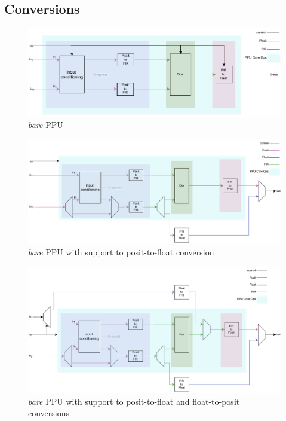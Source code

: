 \subsection{Conversions}







\begin{figure}[H]
        \centering
        \includegraphics[width=1\textwidth]{figures/top_no_conversions.pdf}
        \caption{\textit{bare} PPU}
\end{figure}
\begin{figure}
        \includegraphics[width=1\textwidth]{figures/top_P2F.pdf}
        \caption{\textit{bare} PPU with support to posit-to-float conversion}
        \label{fig:top_p2f_00000001}
\end{figure}
\begin{figure}
        \includegraphics[width=1\textwidth]{figures/top_all.pdf}
        \caption{\textit{bare} PPU with support to posit-to-float and float-to-posit conversions}
\end{figure}



